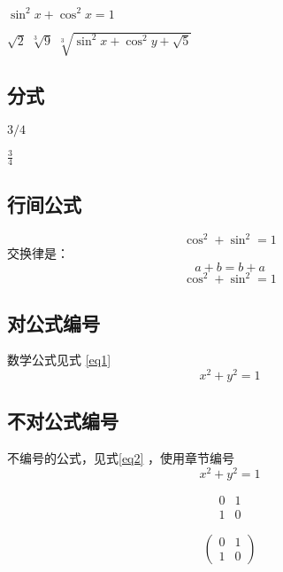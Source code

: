 \documentclass[]{ctexart}
\begin{document}
 	$ \sin^2x + \cos^2x = 1 $
 	
 	$ \sqrt{2} $
 	$ \sqrt[3]{9} $
 	$ \sqrt[3]{ \sin^2x + \cos^2y + \sqrt{5} } $
 	
 	\subsection{分式}
 	$ 3/4 $
 	
 	$ \frac{3}{4} $
 	
 	\subsection{行间公式}
 	$$ \cos^2 + \sin^2 = 1 $$ 
 	交换律是： \[ a+b = b+a \]
 	\begin{displaymath}
 		\cos^2 + \sin^2 = 1
 	\end{displaymath}
 	
 	\subsection{对公式编号}
 	数学公式见式 \ref{eq1}	%
 	\begin{equation}
 		x^2 + y^2 =1 
 		\label{eq1}
 	\end{equation}
 	
 	\subsection{不对公式编号}
 	不编号的公式，见式\ref{eq2} ，使用章节编号
 	\begin{equation*}
 		x^2 + y^2 =1 
 		\label{eq2}
 	\end{equation*}
 	


	\[
		\begin{matrix}
		0 & 1 \\
		1 & 0
		\end{matrix}
	\]
	
	\[
		\begin{pmatrix}
			0 & 1 \\
			1 & 0
		\end{pmatrix}
	\]
	
\end{document}
